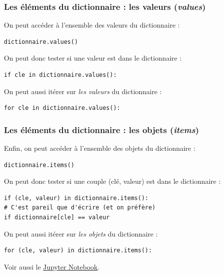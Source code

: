 \documentclass[x11names,svgnames]{beamer}
\begin{document}
\begin{frame}[fragile]
  \frametitle{Les éléments du dictionnaire : les valeurs (\emph{values})}

    On peut accéder à l'ensemble des valeurs du dictionnaire :
  \begin{mdframed}[roundcorner=5pt]
\begin{verbatim}
dictionnaire.values()
\end{verbatim}
  \end{mdframed}
    On peut donc tester si une valeur est dans le dictionnaire :
  \begin{mdframed}[roundcorner=5pt]
\begin{verbatim}
if cle in dictionnaire.values():
\end{verbatim}
  \end{mdframed}
  On peut aussi \alert{itérer} sur \emph{les valeurs} du dictionnaire :
  \begin{mdframed}[roundcorner=5pt]
\begin{verbatim}
for cle in dictionnaire.values():
\end{verbatim}
  \end{mdframed}
  \end{frame}

\begin{frame}[fragile]
  \frametitle{Les éléments du dictionnaire : les objets (\emph{items})}

    Enfin, on peut accéder à l'ensemble des objets du dictionnaire :
  \begin{mdframed}[roundcorner=5pt]
\begin{verbatim}
dictionnaire.items()
\end{verbatim}
  \end{mdframed}
    On peut donc tester si une couple (clé, valeur) est dans le dictionnaire :
  \begin{mdframed}[roundcorner=5pt]
\begin{verbatim}
if (cle, valeur) in dictionnaire.items():
# C'est pareil que d'écrire (et on préfère)
if dictionnaire[cle] == valeur
\end{verbatim}
  \end{mdframed}
  On peut aussi \alert{itérer} sur \emph{les objets} du dictionnaire :
  \begin{mdframed}[roundcorner=5pt]
\begin{verbatim}
for (cle, valeur) in dictionnaire.items():
\end{verbatim}
  \end{mdframed}

  Voir aussi le \href{https://mybinder.org/v2/gh/UGE-IGM/amphis-AP1/main?labpath=2023-2024%2F7-dictionnaires%2F7-dictionnaires.ipynb}{Jupyter Notebook}.
\end{frame}
\end{document}
